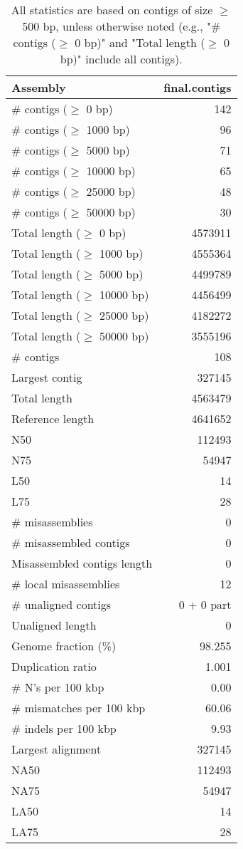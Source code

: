 \documentclass[12pt,a4paper]{article}
\begin{document}
\begin{table}[ht]
\begin{center}
\caption{All statistics are based on contigs of size $\geq$ 500 bp, unless otherwise noted (e.g., "\# contigs ($\geq$ 0 bp)" and "Total length ($\geq$ 0 bp)" include all contigs).}
\begin{tabular}{|l*{1}{|r}|}
\hline
Assembly & final.contigs \\ \hline
\# contigs ($\geq$ 0 bp) & 142 \\ \hline
\# contigs ($\geq$ 1000 bp) & 96 \\ \hline
\# contigs ($\geq$ 5000 bp) & 71 \\ \hline
\# contigs ($\geq$ 10000 bp) & 65 \\ \hline
\# contigs ($\geq$ 25000 bp) & 48 \\ \hline
\# contigs ($\geq$ 50000 bp) & 30 \\ \hline
Total length ($\geq$ 0 bp) & 4573911 \\ \hline
Total length ($\geq$ 1000 bp) & 4555364 \\ \hline
Total length ($\geq$ 5000 bp) & 4499789 \\ \hline
Total length ($\geq$ 10000 bp) & 4456499 \\ \hline
Total length ($\geq$ 25000 bp) & 4182272 \\ \hline
Total length ($\geq$ 50000 bp) & 3555196 \\ \hline
\# contigs & 108 \\ \hline
Largest contig & 327145 \\ \hline
Total length & 4563479 \\ \hline
Reference length & 4641652 \\ \hline
N50 & 112493 \\ \hline
N75 & 54947 \\ \hline
L50 & 14 \\ \hline
L75 & 28 \\ \hline
\# misassemblies & 0 \\ \hline
\# misassembled contigs & 0 \\ \hline
Misassembled contigs length & 0 \\ \hline
\# local misassemblies & 12 \\ \hline
\# unaligned contigs & 0 + 0 part \\ \hline
Unaligned length & 0 \\ \hline
Genome fraction (\%) & 98.255 \\ \hline
Duplication ratio & 1.001 \\ \hline
\# N's per 100 kbp & 0.00 \\ \hline
\# mismatches per 100 kbp & 60.06 \\ \hline
\# indels per 100 kbp & 9.93 \\ \hline
Largest alignment & 327145 \\ \hline
NA50 & 112493 \\ \hline
NA75 & 54947 \\ \hline
LA50 & 14 \\ \hline
LA75 & 28 \\ \hline
\end{tabular}
\end{center}
\end{table}
\end{document}
